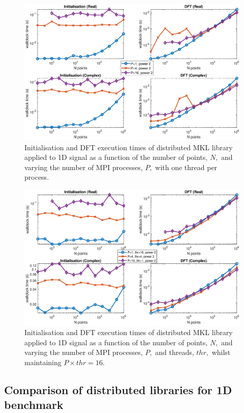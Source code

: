 \documentclass[a4paper]{article}
\begin{document}
\begin{figure}[htb]
    \centering
    \includegraphics[width=0.9\linewidth]{../results/mkl_1d_mpi.eps}
  \caption{Initialisation and DFT execution times of distributed MKL library applied to 1D signal as a function of the
    number of points, $N,$ and varying the number of MPI processes, $P,$ with one thread per process.}
  \label{1DDistMKL}
\end{figure}

\begin{figure}[htb]
    \centering
    \includegraphics[width=0.9\linewidth]{../results/mkl_1d_mpi_thr.eps}
  \caption{Initialisation and DFT execution times of distributed MKL library applied to 1D signal as a function of the
    number of points, $N,$ and varying the number of MPI processes, $P,$ and threads, $thr,$ whilst maintaining $P\times thr=16.$}
  \label{1DDistMKL16}
\end{figure}






\subsection{Comparison of distributed libraries for 1D benchmark}\label{Sec:1DDistComp}
\end{document}
